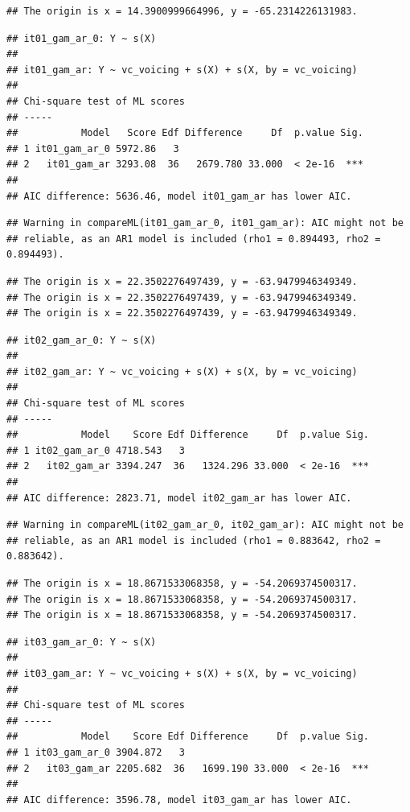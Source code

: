 \documentclass[12pt,]{article}
\begin{document}
\begin{verbatim}
## The origin is x = 14.3900999664996, y = -65.2314226131983.
\end{verbatim}

\begin{verbatim}
## it01_gam_ar_0: Y ~ s(X)
## 
## it01_gam_ar: Y ~ vc_voicing + s(X) + s(X, by = vc_voicing)
## 
## Chi-square test of ML scores
## -----
##           Model   Score Edf Difference     Df  p.value Sig.
## 1 it01_gam_ar_0 5972.86   3                                
## 2   it01_gam_ar 3293.08  36   2679.780 33.000  < 2e-16  ***
## 
## AIC difference: 5636.46, model it01_gam_ar has lower AIC.
\end{verbatim}

\begin{verbatim}
## Warning in compareML(it01_gam_ar_0, it01_gam_ar): AIC might not be
## reliable, as an AR1 model is included (rho1 = 0.894493, rho2 = 0.894493).
\end{verbatim}

\begin{verbatim}
## The origin is x = 22.3502276497439, y = -63.9479946349349.
## The origin is x = 22.3502276497439, y = -63.9479946349349.
## The origin is x = 22.3502276497439, y = -63.9479946349349.
\end{verbatim}

\begin{verbatim}
## it02_gam_ar_0: Y ~ s(X)
## 
## it02_gam_ar: Y ~ vc_voicing + s(X) + s(X, by = vc_voicing)
## 
## Chi-square test of ML scores
## -----
##           Model    Score Edf Difference     Df  p.value Sig.
## 1 it02_gam_ar_0 4718.543   3                                
## 2   it02_gam_ar 3394.247  36   1324.296 33.000  < 2e-16  ***
## 
## AIC difference: 2823.71, model it02_gam_ar has lower AIC.
\end{verbatim}

\begin{verbatim}
## Warning in compareML(it02_gam_ar_0, it02_gam_ar): AIC might not be
## reliable, as an AR1 model is included (rho1 = 0.883642, rho2 = 0.883642).
\end{verbatim}

\begin{verbatim}
## The origin is x = 18.8671533068358, y = -54.2069374500317.
## The origin is x = 18.8671533068358, y = -54.2069374500317.
## The origin is x = 18.8671533068358, y = -54.2069374500317.
\end{verbatim}

\begin{verbatim}
## it03_gam_ar_0: Y ~ s(X)
## 
## it03_gam_ar: Y ~ vc_voicing + s(X) + s(X, by = vc_voicing)
## 
## Chi-square test of ML scores
## -----
##           Model    Score Edf Difference     Df  p.value Sig.
## 1 it03_gam_ar_0 3904.872   3                                
## 2   it03_gam_ar 2205.682  36   1699.190 33.000  < 2e-16  ***
## 
## AIC difference: 3596.78, model it03_gam_ar has lower AIC.
\end{verbatim}
\end{document}
